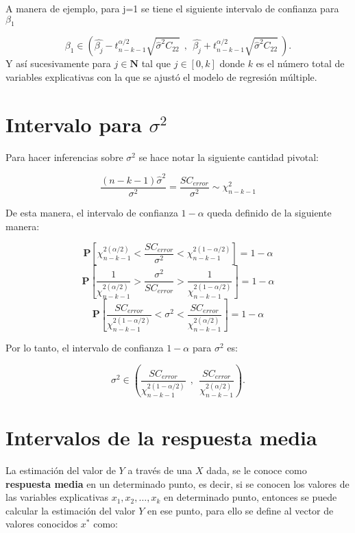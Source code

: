 \documentclass[
  a4paper,
  oneside,
  openany]{book}
\begin{document}
A manera de ejemplo, para j=1 se tiene el siguiente intervalo de confianza para \(\beta_1\)

\[\beta_{1} \in \left(\hat{\beta_{j}}-t^{\alpha/2}_{n-k-1}{\sqrt{\hat{\sigma}^2C_{22}}} \ \ , \ \ \hat{\beta_{j}}+t^{\alpha/2}_{n-k-1}{\sqrt{\hat{\sigma}^2C_{22}}} \  \right).\]
Y así sucesivamente para \(j \in \mathbf{N}\) tal que \(j \in [0,k]\) donde \(k\) es el número total de variables explicativas con la que se ajustó el modelo de regresión múltiple.

\hypertarget{intervalo-para-sigma2-1}{%
\section{\texorpdfstring{Intervalo para \(\sigma^2\)}{Intervalo para \textbackslash sigma\^{}2}}\label{intervalo-para-sigma2-1}}

Para hacer inferencias sobre \(\sigma^2\) se hace notar la siguiente cantidad pivotal:

\[\frac{(n-k-1)\hat{\sigma}^2}{\sigma^2}=\frac{SC_{error}}{\sigma^2} \sim \chi^2_{n-k-1}\]

De esta manera, el intervalo de confianza \(1-\alpha\) queda definido de la siguiente manera:

\[\mathbf{P}\left[ \chi^{2(\alpha/2)}_{n-k-1}<\frac{SC_{error}}{\sigma^2}<\chi^{2(1-\alpha/2)}_{n-k-1}\right]=1-\alpha\]
\[\mathbf{P}\left[ \frac{1}{\chi^{2(\alpha/2)}_{n-k-1}}>\frac{\sigma^2}{SC_{error}}>\frac{1}{\chi^{2(1-\alpha/2)}_{n-k-1}}\right]=1-\alpha\]
\[\mathbf{P}\left[ \frac{SC_{error}}{\chi^{2(1-\alpha/2)}_{n-k-1}}<\sigma^2<\frac{SC_{error}}{\chi^{2(\alpha/2)}_{n-k-1}}\right]=1-\alpha\]

Por lo tanto, el intervalo de confianza \(1-\alpha\) para \(\sigma^2\) es:

\[\sigma^2 \in \left(\frac{SC_{error}}{\chi^{2(1-\alpha/2)}_{n-k-1}}\ \ , \ \ \frac{SC_{error}}{\chi^{2(\alpha/2)}_{n-k-1}}\right).\]

\hypertarget{intervalos-de-la-respuesta-media}{%
\section{Intervalos de la respuesta media}\label{intervalos-de-la-respuesta-media}}

La estimación del valor de \(Y\) a través de una \(X\) dada, se le conoce como \textbf{respuesta media} en un determinado punto, es decir, si se conocen los valores de las variables explicativas \(x_{1},x_{2}, \ldots , x_{k}\) en determinado punto, entonces se puede calcular la estimación del valor \(Y\) en ese punto, para ello se define al vector de valores conocidos \(x^*\) como:
\end{document}
